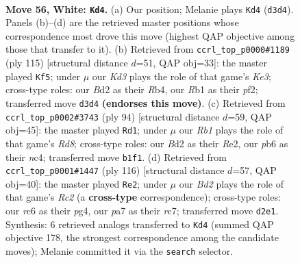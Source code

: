 \documentclass[11pt]{article}
\begin{document}
\clearpage

\begin{figure}[p]\centering
\begin{subfigure}{0.46\textwidth}\centering
\resizebox{\linewidth}{!}{%
\newchessgame
\chessboard[
  setfen={7r/p7/1pr1p1kp/n7/2P1P3/N2K4/P2B2PR/1R6 w - - 5 56},
  showmover=false,
  pgfstyle=straightmove, color=movearrow, markmove={d3-d4}
]}
\caption{}
\end{subfigure}\hfill
\begin{subfigure}{0.46\textwidth}\centering
\resizebox{\linewidth}{!}{%
\newchessgame
\chessboard[
  setfen={8/6p1/r3k3/P1R1p1p1/1rN1p1n1/6P1/5P2/R5K1 b - - 27 58},
  showmover=false,
  pgfstyle=straightmove, color=movearrow, markmove={e6-f5}
]}
\caption{}
\end{subfigure}
\\[4pt]
\begin{subfigure}{0.46\textwidth}\centering
\resizebox{\linewidth}{!}{%
\newchessgame
\chessboard[
  setfen={3R4/5r2/2b1r1pB/1p6/1kn1p1PN/5PK1/2P1R3/8 w - - 0 48},
  showmover=false,
  pgfstyle=straightmove, color=movearrow, markmove={d8-d1}
]}
\caption{}
\end{subfigure}\hfill
\begin{subfigure}{0.46\textwidth}\centering
\resizebox{\linewidth}{!}{%
\newchessgame
\chessboard[
  setfen={3r4/2r1pk2/p7/Pp1P4/2n2Pp1/1N4K1/1PR5/3R4 w - - 0 59},
  showmover=false,
  pgfstyle=straightmove, color=movearrow, markmove={c2-e2}
]}
\caption{}
\end{subfigure}
\caption{\textbf{Move 56, White: \texttt{Kd4}.} (a) Our position; Melanie plays \texttt{Kd4} (\texttt{d3d4}). Panels (b)--(d) are the retrieved master positions whose correspondence most drove this move (highest QAP objective among those that transfer to it). (b) Retrieved from \texttt{ccrl\_top\_p0000\#1189} (ply 115) [structural distance $d$=51, QAP obj=33]: the master played \texttt{Kf5}; under $\mu$ our \emph{Kd3} plays the role of that game's \emph{Ke3}; cross-type roles: our \emph{B}d2 as their \emph{R}b4, our \emph{R}b1 as their \emph{p}f2; transferred move \texttt{d3d4} \textbf{(endorses this move)}. (c) Retrieved from \texttt{ccrl\_top\_p0002\#3743} (ply 94) [structural distance $d$=59, QAP obj=45]: the master played \texttt{Rd1}; under $\mu$ our \emph{Rb1} plays the role of that game's \emph{Rd8}; cross-type roles: our \emph{B}d2 as their \emph{R}e2, our \emph{p}b6 as their \emph{n}c4; transferred move \texttt{b1f1}. (d) Retrieved from \texttt{ccrl\_top\_p0001\#1447} (ply 116) [structural distance $d$=57, QAP obj=40]: the master played \texttt{Re2}; under $\mu$ our \emph{Bd2} plays the role of that game's \emph{Rc2} (a \textbf{cross-type} correspondence); cross-type roles: our \emph{r}c6 as their \emph{p}g4, our \emph{p}a7 as their \emph{r}c7; transferred move \texttt{d2e1}. Synthesis: 6 retrieved analogs transferred to \texttt{Kd4} (summed QAP objective 178, the strongest correspondence among the candidate moves); Melanie committed it via the \texttt{search} selector.}
\label{fig:thought-m110}
\end{figure}
\end{document}
